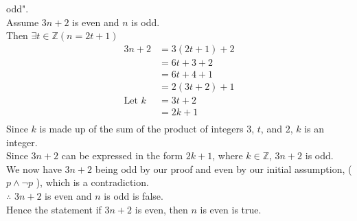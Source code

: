 \documentclass[12pt letter]{report}
\begin{document}
{\begin{enumerate}
\begin{myproof}
			      odd".\\
			      Assume $3n + 2$ is even and $n$ is odd. \\
			      Then $\exists t \in \mathbb{Z} \left( n =
				      2t + 1 \right) $
			      \begin{align*}
				      3n + 2        & = 3 \left( 2t +1 \right)  +2  \\
				                    & = 6t + 3 +2                   \\
				                    & = 6t + 4 + 1                  \\
				                    & = 2 \left( 3t + 2 \right) + 1 \\
				      \text{Let } k & = 3t + 2                      \\
				                    & = 2k +1                       \\
			      \end{align*}
			      Since $k$ is made up of the sum of the product of integers $3$, $t$, and $2$, $k$ is an integer.\\
			      Since $3n + 2$ can be expressed in the form $2k + 1$, where $k \in \mathbb{Z}$, $3n + 2$ is odd.\\
			      We now have $3n +2$ being odd by our proof and even by our initial assumption, ( $p \wedge \neg p$ ),
			      which is a contradiction. \\
			      $\therefore$ $3n + 2$ is even and $n$ is odd is false.\\
			      Hence the statement if $3n + 2$ is even, then $n$ is even is true.
		      \end{myproof}
	\end{enumerate}
}


\sol{
	\begin{enumerate}
		\item
		      \[
			      B \times C \times A = \left\{ \left( x,0,a \right), \left( x,0,b \right), \left( x,1,a \right), \left( x,1,b
			      \right), \left( y,0,a \right), \left( y,0,b \right), \left( y,1,a \right), \left( y,1,b \right)         \right\}
		      \]
		\item
		      \[
			      B^3 = \left\{ \left( x,x,x \right), \left( x,x,y \right), \left( x,y,x \right),  \left( x,y,y \right), \left( y,y,y \right),
			      \left( y,y,x \right), \left( y,x,y \right), \left( y,x,x \right)        \right\}
		      \]
	\end{enumerate}
}
\end{document}
